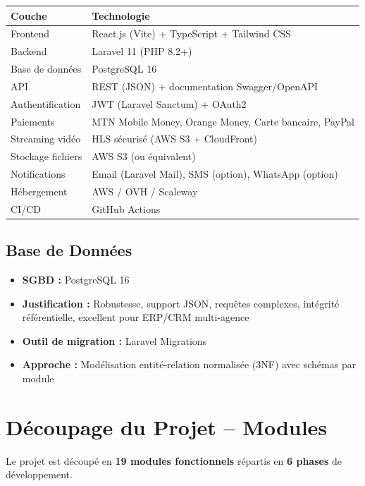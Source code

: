 \documentclass[12pt,a4paper]{report}
\begin{document}
{\small
\noindent\begin{tabularx}{\textwidth}{l X}
    \toprule
    \textbf{Couche} & \textbf{Technologie} \\
    \midrule
    Frontend & React.js (Vite) + TypeScript + Tailwind CSS \\
    Backend & Laravel 11 (PHP 8.2+) \\
    Base de données & PostgreSQL 16 \\
    API & REST (JSON) + documentation Swagger/OpenAPI \\
    Authentification & JWT (Laravel Sanctum) + OAuth2 \\
    Paiements & MTN Mobile Money, Orange Money, Carte bancaire, PayPal \\
    Streaming vidéo & HLS sécurisé (AWS S3 + CloudFront) \\
    Stockage fichiers & AWS S3 (ou équivalent) \\
    Notifications & Email (Laravel Mail), SMS (option), WhatsApp (option) \\
    Hébergement & AWS / OVH / Scaleway \\
    CI/CD & GitHub Actions \\
    \bottomrule
\end{tabularx}}

\section{Base de Données}
\begin{itemize}
    \item \textbf{SGBD :} PostgreSQL 16
    \item \textbf{Justification :} Robustesse, support JSON, requêtes complexes, intégrité référentielle, excellent pour ERP/CRM multi-agence
    \item \textbf{Outil de migration :} Laravel Migrations
    \item \textbf{Approche :} Modélisation entité-relation normalisée (3NF) avec schémas par module
\end{itemize}

\chapter{Découpage du Projet -- Modules}

Le projet est découpé en \textbf{19 modules fonctionnels} répartis en \textbf{6 phases} de développement.
\end{document}
